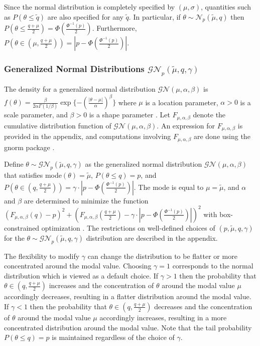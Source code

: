 \documentclass[useAMS,usenatbib,referee]{biom}
\begin{document}
 Since the normal distribution is completely specified by $(\mu, \sigma)$, quantities such as $P(\theta\leq\tilde{q})$ are also specified for any $\tilde{q}$. In particular, if $\theta\sim\mathcal{N}_p(\tilde{\mu},q)$ then $P(\theta\leq\frac{q+\mu}{2})=\Phi(\frac{\Phi^{-1}(p)}{2})$. Furthermore, $P(\theta\in(\mu,\frac{q+\mu}{2}))=|p-\Phi(\frac{\Phi^{-1}(p)}{2})|$. 

\subsubsection{Generalized Normal Distributions $\mathcal{GN}_p(\tilde{\mu},q,\gamma)$}
The density for a generalized normal distribution $\mathcal{GN}(\mu,\alpha,\beta)$ is
$
f(\theta)=\frac{\beta}{2\alpha\Gamma(1/\beta)}\exp\{-(\frac{|\theta-\mu|}{\alpha})^\beta\}
$ where $\mu$ is a location parameter, $\alpha>0$ is a scale parameter, and $\beta>0$ is a shape parameter \citep{Nadarajah2005}. Let $F_{\mu,\alpha,\beta}$ denote the cumulative distribution function of $\mathcal{GN}(\mu,\alpha,\beta)$. An expression for $F_{\mu,\alpha,\beta}$ is provided in the appendix, and computations involving $F_{\mu,\alpha,\beta}$ are done using the gnorm package \citep{Griffin2018}.

Define $\theta\sim\mathcal{GN}_p(\tilde{\mu},q,\gamma)$ as the generalized normal distribution $\mathcal{GN}(\mu,\alpha,\beta)$ that satisfies mode$(\theta)=\tilde{\mu}$, $P(\theta\leq q)=p$, and $P(\theta\in(q,\frac{q+\mu}{2}))=\gamma\cdot|p-\Phi(\frac{\Phi^{-1}(p)}{2})|$.
%
The mode is equal to $\mu=\tilde{\mu}$, and $\alpha$ and $\beta$ are determined to minimize the function $(F_{\mu,\alpha,\beta}(q)-p)^2+(F_{\mu,\alpha,\beta}(\frac{q+\mu}{2})-\gamma\cdot|p-\Phi(\frac{\Phi^{-1}(p)}{2})|)^2$ with box-constrained optimization \citep{Byrd1995}. The restrictions on well-defined choices of $(p,\tilde{\mu},q,\gamma)$ for the $\theta\sim\mathcal{GN}_p(\tilde{\mu},q,\gamma)$ distribution are described in the appendix.

The flexibility to modify $\gamma$ can change the distribution to be flatter or more concentrated around the modal value. Choosing $\gamma=1$ corresponds to the normal distribution which is viewed as a default choice. If $\gamma>1$ then the probability that $\theta\in(q,\frac{q+\mu}{2})$ increases and the concentration of $\theta$ around the modal value $\mu$ accordingly decreases, resulting in a flatter distribution around the modal value. If $\gamma<1$ then the probability that $\theta\in(q,\frac{q+\mu}{2})$ decreases and the concentration of $\theta$ around the modal value $\mu$ accordingly increases, resulting in a more concentrated distribution around the modal value. Note that the tail probability $P(\theta\leq q)=p$ is maintained regardless of the choice of $\gamma$. 
\end{document}
